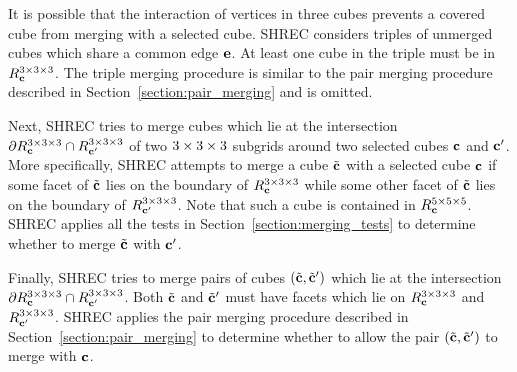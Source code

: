 It is possible that the interaction of vertices in three cubes
prevents a covered cube from merging with a selected cube.
SHREC considers triples of unmerged cubes
which share a common edge $\mathbf{e}$.
At least one cube in the triple must be in $R^{3 \times 3 \times 3}_{\mathbf{c}}$.
The triple merging procedure is similar to the pair merging procedure
described in Section~\ref{section:pair_merging} and is omitted.

Next, SHREC tries to merge cubes which lie 
at the intersection $\partial R^{3 \times 3 \times 3}_{\mathbf{c}} \cap R^{3 \times 3 \times 3}_{\mathbf{c}'}$
of two $3 \times 3 \times 3$ subgrids around two selected cubes $\mathbf{c}$ and $\mathbf{c}'$.
More specifically, SHREC attempts to merge a cube ${\tilde{\mathbf{c}}}$ 
with a selected cube $\mathbf{c}$ if some facet of ${\tilde{\mathbf{c}}}$ lies 
on the boundary of $R^{3 \times 3 \times 3}_{\mathbf{c}}$ 
while some other facet of ${\tilde{\mathbf{c}}}$ lies on the boundary of $R^{3 \times 3 \times 3}_{\mathbf{c}'}$.
Note that such a cube is contained in $R^{5 \times 5 \times 5}_{\mathbf{c}}$.
SHREC applies all the tests in Section~\ref{section:merging_tests}
to determine whether to merge ${\tilde{\mathbf{c}}}$ with $\mathbf{c}'$.

Finally, SHREC tries to merge pairs of cubes $({\tilde{\mathbf{c}}}, {\tilde{\mathbf{c}}}')$ which lie
at the intersection $\partial R^{3 \times 3 \times 3}_{\mathbf{c}} \cap R^{3 \times 3 \times 3}_{\mathbf{c}'}$.
Both ${\tilde{\mathbf{c}}}$ and ${\tilde{\mathbf{c}}}'$ must have facets which lie on $R^{3 \times 3 \times 3}_{\mathbf{c}}$
and $R^{3 \times 3 \times 3}_{\mathbf{c}'}$.
SHREC applies the pair merging procedure described 
in Section~\ref{section:pair_merging} to determine whether
to allow the pair $({\tilde{\mathbf{c}}},{\tilde{\mathbf{c}}}')$ to merge with $\mathbf{c}$.


